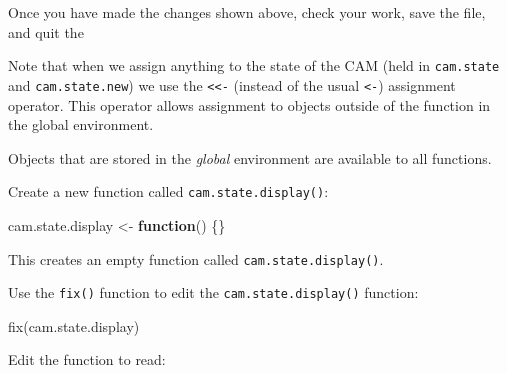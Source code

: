 \documentclass[
  12pt,
  a4paper]{book}
\newenvironment{Shaded}{\begin{snugshade}}{\end{snugshade}}
\newcommand{\AttributeTok}[1]{\textcolor[rgb]{0.77,0.63,0.00}{#1}}
\newcommand{\ConstantTok}[1]{\textcolor[rgb]{0.00,0.00,0.00}{#1}}
\newcommand{\ControlFlowTok}[1]{\textcolor[rgb]{0.13,0.29,0.53}{\textbf{#1}}}
\newcommand{\DecValTok}[1]{\textcolor[rgb]{0.00,0.00,0.81}{#1}}
\newcommand{\FunctionTok}[1]{\textcolor[rgb]{0.00,0.00,0.00}{#1}}
\newcommand{\NormalTok}[1]{#1}
\newcommand{\OtherTok}[1]{\textcolor[rgb]{0.56,0.35,0.01}{#1}}
\newcommand{\SpecialCharTok}[1]{\textcolor[rgb]{0.00,0.00,0.00}{#1}}
\newcommand{\StringTok}[1]{\textcolor[rgb]{0.31,0.60,0.02}{#1}}
\begin{document}
Once you have made the changes shown above, check your work, save the file, and quit the

Note that when we assign anything to the state of the CAM (held in \texttt{cam.state} and \texttt{cam.state.new}) we use the \texttt{\textless{}\textless{}-} (instead of the usual \texttt{\textless{}-}) assignment operator. This operator allows assignment to objects outside of the function in the global environment.

Objects that are stored in the \emph{global} environment are available to all functions.

Create a new function called \texttt{cam.state.display()}:

\begin{Shaded}
\begin{Highlighting}[]
\NormalTok{cam.state.display }\OtherTok{\textless{}{-}} \ControlFlowTok{function}\NormalTok{() \{\}}
\end{Highlighting}
\end{Shaded}

This creates an empty function called \texttt{cam.state.display()}.

Use the \texttt{fix()} function to edit the \texttt{cam.state.display()} function:

\begin{Shaded}
\begin{Highlighting}[]
\FunctionTok{fix}\NormalTok{(cam.state.display)}
\end{Highlighting}
\end{Shaded}

Edit the function to read:

\begin{Shaded}
\end{Shaded}
\end{document}
